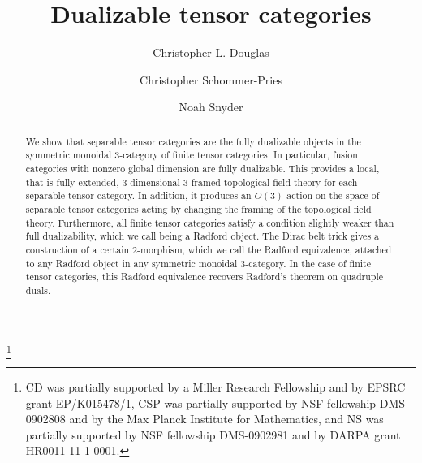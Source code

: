 \documentclass{amsart}
\begin{document}
\title{Dualizable tensor categories}

\begin{abstract}
We show that separable tensor categories are the fully dualizable objects in the symmetric monoidal $3$-category of finite tensor categories.  In particular, fusion categories with nonzero global dimension are fully dualizable.   This provides a local, that is fully extended, 3-dimensional 3-framed topological field theory for each separable tensor category. In addition, it produces an $O(3)$-action on the space of separable tensor categories acting by changing the framing of the topological field theory. Furthermore, all finite tensor categories satisfy a condition slightly weaker than full dualizability, which we call being a Radford object.  The Dirac belt trick gives a construction of a certain $2$-morphism, which we call the Radford equivalence, attached to any Radford object in any symmetric monoidal $3$-category.  In the case of finite tensor categories, this Radford equivalence recovers Radford's theorem on quadruple duals.

\end{abstract}

\author{Christopher L. Douglas}
\address{Mathematical Institute\\ University of Oxford\\ Oxford OX1 3LB\\ United Kingdom}
      	
\author{Christopher Schommer-Pries}
\address{Department of Mathematics\\ Max Planck Institute for Mathematics \\ 53111 Bonn \\ Germany}

\author{Noah Snyder}
\address{Department of Mathematics\\ Indiana University\\ Bloomington, IN 47401\\ USA}

\thanks{CD was partially supported by a Miller Research Fellowship and by EPSRC grant EP/K015478/1, CSP was partially supported by NSF fellowship DMS-0902808 and by the Max Planck Institute for Mathematics, and NS was partially supported by NSF fellowship DMS-0902981 and by DARPA grant HR0011-11-1-0001.}
\end{document}
